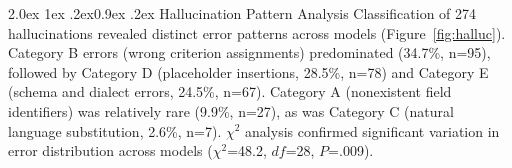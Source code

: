 \documentclass[10pt,twocolumn]{article}
\makeatletter
\renewcommand\subsection{\@startsection{subsection}{2}{\z@}%
  {2.0ex \@plus 1ex \@minus .2ex}{0.9ex \@plus .2ex}%
  {\normalfont\normalsize\bfseries}}
\makeatother
\begin{document}
\subsection{Hallucination Pattern Analysis}
Classification of 274 hallucinations revealed distinct error patterns across
models (Figure~\ref{fig:halluc}). Category B errors (wrong criterion
assignments) predominated (34.7\%, n=95), followed by Category D (placeholder insertions, 28.5\%, n=78) and Category E (schema and dialect errors, 24.5\%, n=67). Category A (nonexistent field identifiers) was relatively rare (9.9\%, n=27), as was Category C (natural language substitution, 2.6\%, n=7). $\chi^2$
analysis confirmed significant variation in error distribution across models
($\chi^2$=48.2, $df$=28, $P$=.009).

\end{document}
